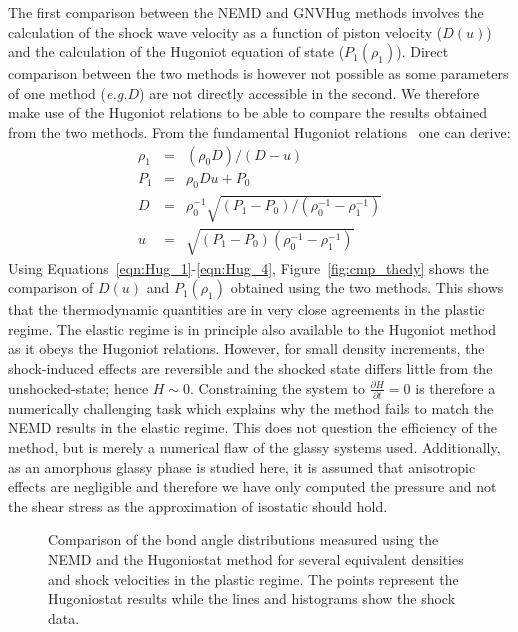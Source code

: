 \documentclass[aps,10pt,twocolumn]{revtex4}
\makeatletter
\newcommand{\eg}{\emph{e.g.}\@\xspace}
\newlength{\picW}	%
\newcommand{\picA}{270}	%
\newcommand{\picL}[1]{\texttt{[image: \#1]}}
\makeatother
\begin{document}
The first comparison between the NEMD and GNVHug methods involves the calculation of the shock wave
velocity as a function of piston velocity ($D(u)$) and the calculation of the Hugoniot equation
of state ($P_1(\rho_1)$). Direct comparison between the two methods is however not possible as
some parameters of one method (\eg $D$) are not directly accessible in the second. We therefore
make use of the Hugoniot relations to be able to compare the results obtained from the two
methods. From the fundamental Hugoniot relations~\cite{Thouvenin} one can derive:
\begin{eqnarray}
	\rho_1	&=& (\rho_0D)/(D-u)	\label{eqn:Hug_1}\\
	P_1		&=&	\rho_0Du + P_0	\label{eqn:Hug_2}\\
	D		&=&	\rho_0^{-1}\sqrt{(P_1-P_0)/(\rho_0^{-1} - \rho_1^{-1})}	\label{eqn:Hug_3}\\
	u		&=& \sqrt{(P_1-P_0)(\rho_0^{-1}-\rho_1^{-1})}					\label{eqn:Hug_4}
\end{eqnarray}
Using Equations~\ref{eqn:Hug_1}-\ref{eqn:Hug_4}, Figure~\ref{fig:cmp_thedy} shows the comparison
of $D(u)$ and $P_1(\rho_1)$ obtained using the two methods. This shows that the thermodynamic
quantities are in very close agreements in the plastic regime. The elastic regime is in principle
also available to the Hugoniot method as it obeys the Hugoniot relations. However, for small
density increments, the  shock-induced effects are reversible and the shocked state differs
little from the unshocked-state; hence $H\sim 0$. Constraining the system to $\frac{\partial H}{\partial
t}=0$ is therefore a numerically challenging  task which explains why the method fails to match
the NEMD results in the elastic regime. This does not question the efficiency of the method, but
is merely a numerical flaw of the glassy systems used.
Additionally, as an amorphous glassy phase is studied here, it is assumed that anisotropic effects are
negligible and therefore we have only computed the pressure and not the shear stress as the
approximation of isostatic should hold.\\



\picW=4cm
\begin{figure}
\subfigure[equivalence (A)]{\picL{fig09a}}
\subfigure[equivalence (B)]{\picL{fig09b}}

\subfigure[equivalence (C)]{\picL{fig09c}}
\subfigure[equivalence (D)]{\picL{fig09d}}
\caption{Comparison of the bond angle distributions measured using the NEMD and the Hugoniostat method
for several equivalent densities and shock velocities in the plastic regime. The points
represent the Hugoniostat results while the lines and histograms show the shock data.}
\label{fig:cmp_BAD}
\end{figure}
\end{document}
